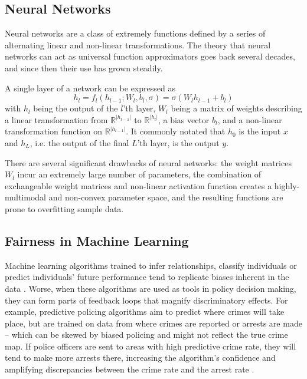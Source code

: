     \subsection{Neural Networks}  \label{sec:intro_nns}
    
        Neural networks are a class of extremely functions defined by a series of alternating linear and non-linear transformations.  The theory that neural networks can act as universal function approximators goes back several decades\cite{cybenko1989approximation}, and since then their use has grown steadily.
        
        A single layer of a network can be expressed as
        $$ h_l = f_l( h_{l-1}; W_l, b_l, \sigma) = \sigma\left( W_l h_{l-1} + b_l \right) $$
        with $h_{l}$ being the output of the $l$'th layer, $W_l$ being a matrix of weights describing a linear transformation from $\mathbb{R}^{|h_{l-1}|}$ to $\mathbb{R}^{|h_l|}$, a bias vector $b_l$, and a non-linear transformation function on $\mathbb{R}^{|h_{l-1}|}$.  It commonly notated that $h_0$ is the input $x$ and $h_L$, i.e. the output of the final $L$'th layer, is the output $y$.
        
        There are several significant drawbacks of neural networks: the weight matrices $W_l$ incur an extremely large number of parameters, the combination of exchangeable weight matrices and non-linear activation function creates a highly-multimodal and non-convex parameter space, and the resulting functions are prone to overfitting sample data.
    
    \subsection{Fairness in Machine Learning}  \label{sec:intro_fairml}
    
        Machine learning algorithms trained to infer relationships, classify individuals or predict individuals' future performance tend to replicate biases inherent in the data \citep{Caliskan:Bryson:Narayanan:2017,Bornstein:2018,Angwin:Larson:Muttu:Kirchner:2016}. Worse, when these algorithms are used as tools in policy decision making, they can form parts of feedback loops that magnify discriminatory effects. For example, predictive policing algorithms aim to predict where crimes will take place, but are trained on data from where crimes are reported or arrests are made -- which can be skewed by biased policing and might not reflect the true crime map. If police officers are sent to areas with high predictive crime rate, they will tend to make more arrests there, increasing the algorithm's confidence and amplifying discrepancies between the crime rate and the arrest rate \citep{Ensign:2018,Lum:Isaac:2016}. 

